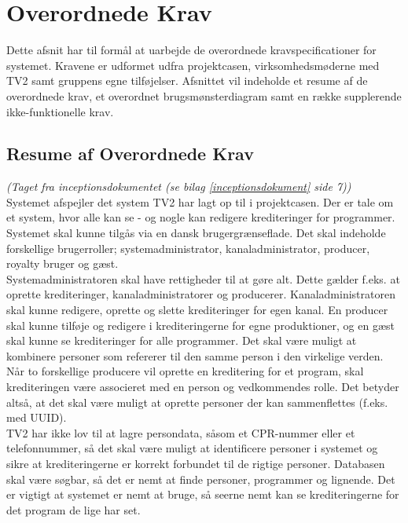 \section{Overordnede Krav}\label{overordnede_krav}

Dette afsnit har til formål at uarbejde de overordnede kravspecificationer for systemet. Kravene er udformet udfra projektcasen, virksomhedsmøderne med TV2 samt gruppens egne tilføjelser.
Afsnittet vil indeholde et resume af de overordnede krav, et overordnet brugsmønsterdiagram samt en række supplerende ikke-funktionelle krav.

\subsection{Resume af Overordnede Krav}

\textit{(Taget fra inceptionsdokumentet (se bilag \ref{inceptionsdokument} side 7))}\\

Systemet afspejler det system TV2 har lagt op til i projektcasen. Der er tale om et system, hvor alle kan se - og nogle kan redigere krediteringer for programmer. Systemet skal kunne tilgås via en dansk brugergrænseflade. Det skal indeholde forskellige brugerroller; systemadministrator, kanaladministrator, producer, royalty bruger og gæst.\\


Systemadministratoren skal have rettigheder til at gøre alt. Dette gælder f.eks. at oprette krediteringer, kanaladministratorer og producerer. Kanaladministratoren skal kunne redigere, oprette og slette krediteringer for egen kanal. En producer skal kunne tilføje og redigere i krediteringerne for egne produktioner, og en gæst skal kunne se krediteringer for alle programmer. 
Det skal være muligt at kombinere personer som refererer til den samme person i den virkelige verden. Når to forskellige producere vil oprette en kreditering for et program, skal krediteringen være associeret med en person og vedkommendes rolle. Det betyder altså, at det skal være muligt at oprette personer der kan sammenflettes (f.eks. med UUID).\\

TV2 har ikke lov til at lagre persondata, såsom et CPR-nummer eller et telefonnummer, så det skal være muligt at identificere personer i systemet og sikre at krediteringerne er korrekt forbundet til de rigtige personer.
Databasen skal være søgbar, så det er nemt at finde personer, programmer og lignende. Det er vigtigt at systemet er nemt at bruge, så seerne nemt kan se krediteringerne for det program de lige har set.\\

